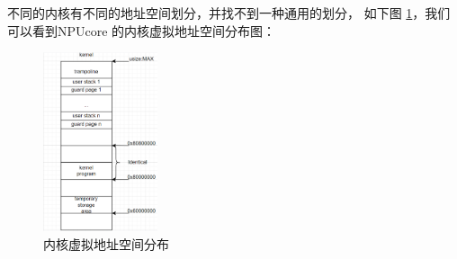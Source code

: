 不同的内核有不同的地址空间划分，并找不到一种通用的划分， 如下图 \ref{内核虚拟地址空间分布}，我们可以看到NPUcore 的内核虚拟地址空间分布图：
\begin{figure}[h]
	\centering
	\includegraphics[width=0.3\textwidth]{figures/04-02-内核虚拟地址空间分布.png}
	\caption{内核虚拟地址空间分布}
	\label{内核虚拟地址空间分布}
\end{figure}

